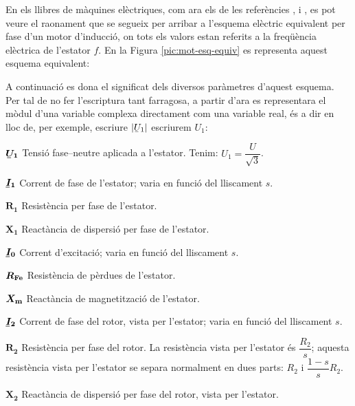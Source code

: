 En els llibres de màquines elèctriques, com ara els de les referències \cite{CHA}, \cite{FIT} i \cite{JFM}, es pot veure el raonament que se segueix per arribar a l'esquema elèctric equivalent per fase d'un motor d'inducció, on tots els valors estan referits a la freqüència elèctrica de l'estator $f$. En la Figura \vref{pic:mot-esq-equiv} es representa aquest esquema equivalent:

\begin{center}
    
    \label{pic:mot-esq-equiv}
\end{center}

A continuació es dona el significat dels diversos paràmetres d'aquest esquema. Per tal de no fer l'escriptura tant farragosa, a partir d'ara es representara el mòdul d'una variable complexa  directament com una variable real, és a dir en lloc de, per exemple, escriure $|\cmplx{U}_1|$ escriurem $U_1$:

\begin{list}{}
   {\setlength{\labelwidth}{12mm} \setlength{\leftmargin}{12mm} \setlength{\labelsep}{2mm}}
   \item[$\boldsymbol{\cmplx{U}_1}$] Tensió fase--neutre aplicada a l'estator. Tenim: $U_1 = \dfrac{U}{\sqrt{3}}$.
   \item[$\boldsymbol{\cmplx{I}_1}$] Corrent de fase de l'estator; varia en funció del lliscament $s$.
   \item[$\boldsymbol{R_1}$] Resistència per fase de l'estator.
   \item[$\boldsymbol{X_1}$] Reactància de dispersió per fase de l'estator.
   \item[$\boldsymbol{\cmplx{I}_0}$] Corrent d'excitació; varia en funció del lliscament $s$.
   \item[$\boldsymbol{R_\mathrm{Fe}}$] Resistència de pèrdues de l'estator.
   \item[$\boldsymbol{X_\mathrm{m}}$] Reactància de magnetització de l'estator.
   \item[$\boldsymbol{\cmplx{I}_2}$] Corrent de fase del rotor, vista per l'estator; varia en funció del lliscament $s$.
   \item[$\boldsymbol{R_2}$] Resistència per fase del rotor. La resistència vista per l'estator és $\dfrac{R_2}{s}$; aquesta resistència vista per l'estator se separa normalment en dues parts: $R_2$ i $\dfrac{1-s}{s} R_2$.
   \item[$\boldsymbol{X_2}$] Reactància de dispersió per fase del rotor, vista per l'estator.
\end{list}

